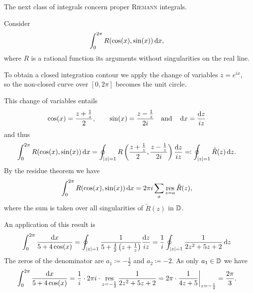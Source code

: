 \documentclass[a4paper,english]{article}
\begin{document}
The next class of integrals concern proper \textsc{Riemann} integrals.
\begin{exampleB}[TODO]
    Consider
    \begin{equation*}
        \int_{0}^{2 \pi} R(\cos(x), \sin(x)) \mathop{}\!\mathrm{d}{x},
    \end{equation*}
    where $R$ is a rational function its arguments without singularities on the real line.
    
    To obtain a closed integration contour we apply the change of variables $z = e^{i x}$, so the non-closed curve over $[0, 2 \pi]$ becomes the unit circle.
    
    This change of variables entails
    \begin{equation*}
        \cos(x)
        = \frac{z + \frac{1}{z}}{2}, \qquad
        \sin(x)
        = \frac{z - \frac{1}{z}}{2 i}
        \quad \text{and} \quad
        \mathop{}\!\mathrm{d}{x} = \frac{\mathop{}\!\mathrm{d}{z}}{i z}
    \end{equation*}
    and thus
    \begin{align*}
        \int_{0}^{2 \pi} R(\cos(x), \sin(x)) \mathop{}\!\mathrm{d}{x}
        = \oint_{| z | = 1} R\left(\frac{z + \frac{1}{z}}{2}, \frac{z - \frac{1}{z}}{2 i}\right) \frac{\mathop{}\!\mathrm{d}{z}}{i z}
        \eqqcolon \oint_{| z | = 1} \tilde{R}(z) \mathop{}\!\mathrm{d}{z}.
    \end{align*}
    By the residue theorem we have
    \begin{equation*}
        \int_{0}^{2 \pi} R(\cos(x), \sin(x)) \mathop{}\!\mathrm{d}{x}
        = 2 \pi i \sum_{a} \operatorname*{res}_{z = a} \tilde{R}(z), 
    \end{equation*}
    where the sum is taken over all singularities of $\tilde{R}(z)$ in $\operatorname{\mathbb{D}}$.
    
    An application of this result is
    \begin{equation*}
        \int_{0}^{2 \pi} \frac{\mathop{}\!\mathrm{d}{x}}{5 + 4 \cos(x)}
        = \oint_{| z | = 1} \frac{1}{5 + \frac{4}{2}\left(z + \frac{1}{z}\right)} \frac{\mathop{}\!\mathrm{d}{z}}{i z}
        = \frac{1}{i} \oint_{| z | = 1} \frac{1}{2 z^2 + 5 z + 2
        } \mathop{}\!\mathrm{d}{z}
    \end{equation*}
    The zeros of the denominator are $a_1 \coloneqq - \frac{1}{2}$ and $a_2 \coloneqq - 2$.
    As only $a_1 \in \operatorname{\mathbb{D}}$ we have
    \begin{equation*}
        \int_{0}^{2 \pi} \frac{\mathop{}\!\mathrm{d}{x}}{5 + 4 \cos(x)}
        = \frac{1}{i} \cdot 2 \pi i \cdot \operatorname*{res}_{z = - \frac{1}{2}} \frac{1}{2 z^2 + 5 z + 2}
        = 2 \pi \cdot \frac{1}{4 z + 5} \bigg|_{z = - \frac{1}{2}}
        = \frac{2 \pi}{3}.
    \end{equation*}
\end{exampleB}
\end{document}
